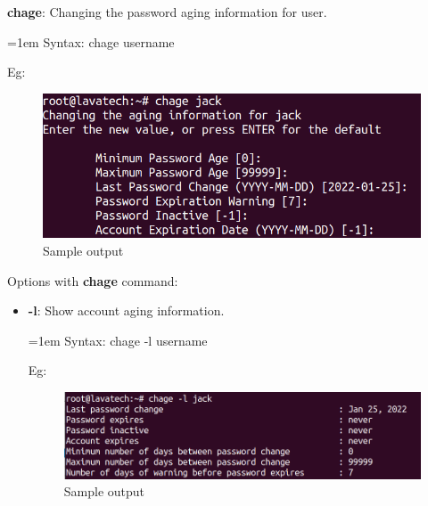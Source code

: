 \begin{flushleft}
\bigskip
\textbf{chage}: Changing the password aging information for user.

\begin{tcolorbox}[breakable,notitle,boxrule=0pt,colback=pink,colframe=pink]
	\color{black}
	\font=1em
	Syntax: chage username
	\font=4pt
\end{tcolorbox}
Eg:
\begin{figure}[h!]
	\centering
	\includegraphics[scale=.5]{content/chapter4/images/chage1.png}
	\caption{Sample output}
	\label{fig:command_prompt5}
\end{figure}

Options with \textbf{chage} command:

\begin{itemize}
	\item \textbf{-l}: Show account aging information.
	\begin{tcolorbox}[breakable,notitle,boxrule=0pt,colback=pink,colframe=pink]
		\color{black}
		\font=1em
		Syntax: chage -l username
		\font=4pt
	\end{tcolorbox}
	Eg:
	\bigskip
	\begin{figure}[h!]
		\centering
		\includegraphics[scale=.5]{content/chapter4/images/chage2.png}
		\caption{Sample output}
		\label{fig:command_prompt8}
	\end{figure}
\end{itemize}

\newpage


\end{flushleft}
